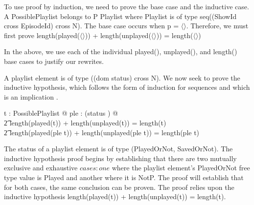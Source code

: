 \documentclass[a4paper,10pt,fleqn]{article}
\begin{document}
\noindent To use proof by induction, we need to prove the base case and the inductive case.  A PossiblePlaylist belongs to P Playlist where Playlist is of type seq((ShowId cross EpisodeId) cross N). The base case occurs when p = $\langle \rangle$. Therefore, we must first prove length(played($\langle \rangle$)) + length(unplayed($\langle \rangle$)) = length($\langle \rangle$)

\bigskip

\begin{center}
\end{center}
\bigskip

\noindent In the above, we use each of the individual played(), unplayed(), and length() base cases to justify our rewrites.

\bigskip

\noindent A playlist element is of type ((dom status) cross N).  We now seek to prove the inductive hypothesis, which follows the form of induction for sequences and which is an implication \citep[page 157]{simpson-notes}.

\bigskip

\begin{zed}
\forall t : PossiblePlaylist @ \forall ple : (\dom status \cross \nat) @ \\
\t2 length(played(t)) + length(unplayed(t)) = length(t) \implies \\
\t2 length(played(\langle ple \rangle \cat t)) + length(unplayed(\langle ple \rangle \cat t)) = length(\langle ple \rangle \cat t)
\end{zed}

\noindent The status of a playlist element is of type (PlayedOrNot, SavedOrNot). The inductive hypothesis proof begins by establishing that there are two mutually exclusive and exhaustive $cases : one$ where the playlist element's PlayedOrNot free type value is Played and another where it is NotP.  The proof will establish that for both cases, the same conclusion can be proven. The proof relies upon the inductive hypothesis length(played(t)) + length(unplayed(t)) = length(t). 
\end{document}
